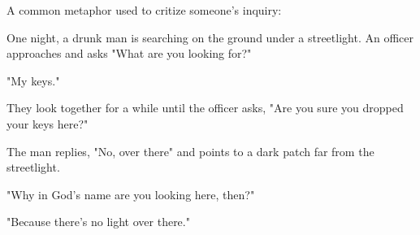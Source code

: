 A common metaphor used to critize someone's inquiry:

One night, a drunk man is searching on the ground under a streetlight. An officer approaches and asks "What are you looking for?"

"My keys."

They look together for a while until the officer asks, "Are you sure you dropped your keys here?"

The man replies, "No, over there" and points to a dark patch far from the streetlight.

"Why in God's name are you looking here, then?"

"Because there's no light over there."